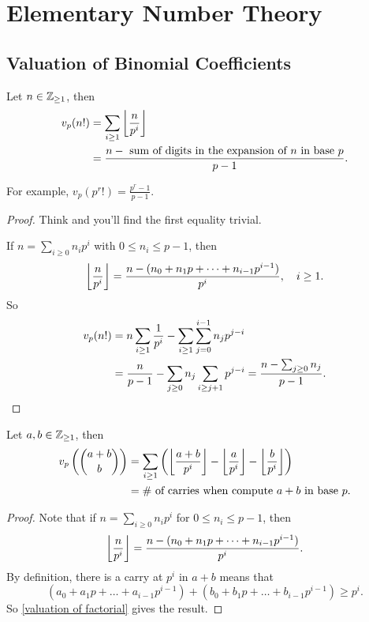 \section{Elementary Number Theory}

\subsection{Valuation of Binomial Coefficients}

\begin{proposition}\label{valuation of factorial}
    Let $n\in\mathbb{Z}_{\ge 1}$, then \begin{align*}
        v_p(n!) &= \sum_{i\ge 1}\left\lfloor \frac{n }{p^i}\right\rfloor \\ &
        = \frac{n - \text{ sum of digits in the expansion of } n \text{ in base }p}{p-1}.
    \end{align*}
\end{proposition}
For example, $\displaystyle v_p(p^r!) = \frac{p^r-1}{p-1}$.
\begin{proof}
    Think and you'll find the first equality trivial.\par
    If $n = \sum_{i \ge 0} n_ip^i$ with $0\le n_i\le p - 1$,
    then \[\left\lfloor \frac{n}{p^i}\right\rfloor = 
        \dfrac{n - (n_0 + n_1p + \dots + n_{i-1}p^{i-1})}{p^i},\quad i\ge 1. 
    \]
    So \begin{align*}
        v_p(n!) &= n\sum_{i\ge 1} \frac{1}{p^i}
        -\sum_{i\ge 1}\sum_{j=0}^{i-1} n_jp^{j-i}\\ &
        = \frac{n}{p-1} - \sum_{j\ge 0}n_j\sum_{i\ge j + 1}p^{j-i}
        = \frac{n - \sum_{j\ge 0}n_j}{p-1}.\qedhere
    \end{align*}
\end{proof}

\begin{corollary}[Kummer]\label{valuation of binomial coeff}
    Let $a, b\in\mathbb{Z}_{\ge 1}$, then
        \begin{align*}
            v_p\left( \binom{a + b}{b} \right)
        &= \sum_{i\ge 1}
        \left( \left\lfloor \frac{a + b}{p^i}\right\rfloor
            - \left\lfloor \frac{a }{p^i }\right\rfloor
            - \left\lfloor \frac{b}{p^i}\right\rfloor \right)\\
        &=\#\text{ of carries when compute } a + b \text{ in base } p.
        \end{align*}    
\end{corollary}
\begin{proof}
    Note that if $n = \sum_{i\ge 0}n_ip^i$ for $0\le n_i\le p - 1$,
    then \[\left\lfloor \frac{n}{p^i}\right\rfloor = \frac{n - (n_0 + n_1p + \dots + n_{i-1}p^{i-1})}{p^i}.\]
    By definition, there is a carry at $p^i$ in $a + b$ means that
    \[(a_0 + a_1p + \dots + a_{i-1}p^{i-1}) + (b_0 + b_1p + \dots + b_{i-1}p^{i-1})\ge p^{i}.\]
    So \cref{valuation of factorial} gives the result.
\end{proof}
